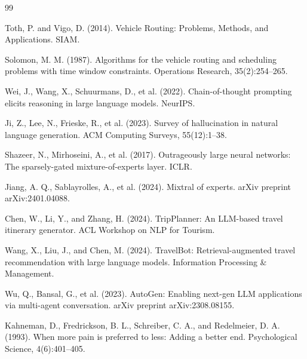 \documentclass[11pt]{article}
\begin{document}

\begin{thebibliography}{99}

Toth, P. and Vigo, D. (2014).
\newblock Vehicle Routing: Problems, Methods, and Applications.
\newblock SIAM.

Solomon, M. M. (1987).
\newblock Algorithms for the vehicle routing and scheduling problems with time window constraints.
\newblock Operations Research, 35(2):254--265.

Wei, J., Wang, X., Schuurmans, D., et al. (2022).
\newblock Chain-of-thought prompting elicits reasoning in large language models.
\newblock NeurIPS.

Ji, Z., Lee, N., Frieske, R., et al. (2023).
\newblock Survey of hallucination in natural language generation.
\newblock ACM Computing Surveys, 55(12):1--38.

Shazeer, N., Mirhoseini, A., et al. (2017).
\newblock Outrageously large neural networks: The sparsely-gated mixture-of-experts layer.
\newblock ICLR.

Jiang, A. Q., Sablayrolles, A., et al. (2024).
\newblock Mixtral of experts.
\newblock arXiv preprint arXiv:2401.04088.

Chen, W., Li, Y., and Zhang, H. (2024).
\newblock TripPlanner: An LLM-based travel itinerary generator.
\newblock ACL Workshop on NLP for Tourism.

Wang, X., Liu, J., and Chen, M. (2024).
\newblock TravelBot: Retrieval-augmented travel recommendation with large language models.
\newblock Information Processing \& Management.

Wu, Q., Bansal, G., et al. (2023).
\newblock AutoGen: Enabling next-gen LLM applications via multi-agent conversation.
\newblock arXiv preprint arXiv:2308.08155.

Kahneman, D., Fredrickson, B. L., Schreiber, C. A., and Redelmeier, D. A. (1993).
\newblock When more pain is preferred to less: Adding a better end.
\newblock Psychological Science, 4(6):401--405.

\end{thebibliography}
\end{document}
